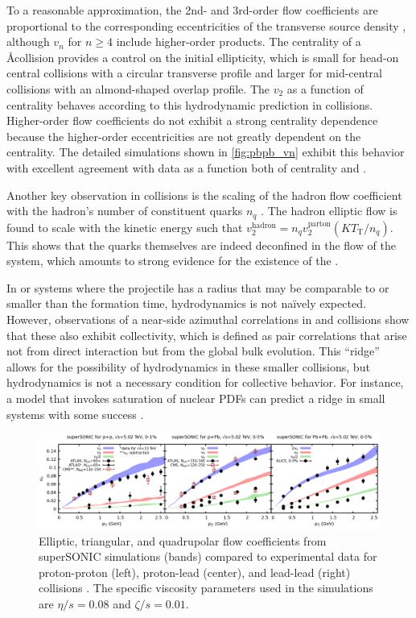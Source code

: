 To a reasonable approximation, the 2nd- and 3rd-order flow coefficients are proportional to the corresponding eccentricities of the transverse source density \cite{Qiu:2011iv}, although $v_n$ for $n \geq 4$ include higher-order products.
The centrality of a \AA collision provides a control on the initial ellipticity, which is small for head-on central collisions with a circular transverse profile and larger for mid-central collisions with an almond-shaped overlap profile.
The $v_2$ as a function of centrality behaves according to this hydrodynamic prediction in \PbPb collisions.
Higher-order flow coefficients do not exhibit a strong centrality dependence because the higher-order eccentricities are not greatly dependent on the centrality.
The detailed simulations shown in \cref{fig:pbpb_vn} exhibit this behavior with excellent agreement with data as a function both of centrality and \pt.

Another key observation in \AuAu collisions is the scaling of the hadron flow coefficient with the hadron's number of constituent quarks $n_q$ \cite{Adare:2006ti}.
The hadron elliptic flow is found to scale with the kinetic energy such that $v_2^\textrm{hadron} = n_q v_2^\textrm{parton} \left(KT_\mathrm{T} / n_q\right)$.
This shows that the quarks themselves are indeed deconfined in the flow of the system, which amounts to strong evidence for the existence of the \qgp.

In \pp or \pA systems where the projectile has a radius that may be comparable to or smaller than the formation time, hydrodynamics is not na\"ively expected.
However, observations of a near-side azimuthal correlations in \pPb \cite{Abelev:2012ola,CMS-HIN-12-005,HION-2013-04} and \pp \cite{CMS-QCD-10-002,HION-2015-09} collisions show that these also exhibit collectivity, which is defined as pair correlations that arise not from direct interaction but from the global bulk evolution.
This ``ridge'' allows for the possibility of hydrodynamics in these smaller collisions, but hydrodynamics is not a necessary condition for collective behavior.
For instance, a \cgc model that invokes saturation of nuclear \acp{PDF} can predict a ridge in small systems with some success \cite{Dusling:2012cg,Dusling:2012wy,Dusling:2013qoz,McLerran:2013una,Kovchegov:2014yza}.

\begin{figure}[t]
  \includegraphics[width=\linewidth]{vn_all.png}
  \caption{Elliptic, triangular, and quadrupolar flow coefficients from superSONIC simulations (bands) compared to experimental data for proton-proton (left), proton-lead (center), and lead-lead (right) collisions \cite{Weller:2017tsr}. The specific viscosity parameters used in the simulations are $\eta/s = 0.08$ and $\zeta/s = 0.01$.}
  \label{fig:vn_all}
\end{figure}

